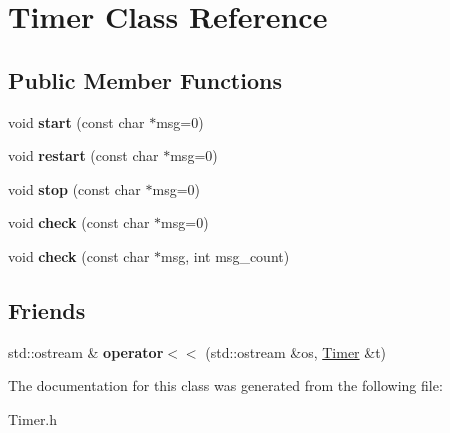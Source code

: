 \hypertarget{class_timer}{}\section{Timer Class Reference}
\label{class_timer}
\subsection*{Public Member Functions}
\begin{DoxyCompactItemize}
\item 
\hypertarget{class_timer_a1bf60b0af4a692b4305dc2f2c771a607}{}void {\bfseries start} (const char $\ast$msg=0)\label{class_timer_a1bf60b0af4a692b4305dc2f2c771a607}

\item 
\hypertarget{class_timer_a482a0e26d4830fbd0a6109d0f4674627}{}void {\bfseries restart} (const char $\ast$msg=0)\label{class_timer_a482a0e26d4830fbd0a6109d0f4674627}

\item 
\hypertarget{class_timer_a7978143362685aa773a82c20e79fac5c}{}void {\bfseries stop} (const char $\ast$msg=0)\label{class_timer_a7978143362685aa773a82c20e79fac5c}

\item 
\hypertarget{class_timer_ad6cf34a57edf68b6c002481b5c99eda0}{}void {\bfseries check} (const char $\ast$msg=0)\label{class_timer_ad6cf34a57edf68b6c002481b5c99eda0}

\item 
\hypertarget{class_timer_a8c693b2452f2b45ec6a8fb447ce8a9d7}{}void {\bfseries check} (const char $\ast$msg, int msg\+\_\+count)\label{class_timer_a8c693b2452f2b45ec6a8fb447ce8a9d7}

\end{DoxyCompactItemize}
\subsection*{Friends}
\begin{DoxyCompactItemize}
\item 
\hypertarget{class_timer_aeb6869755dddf82746eb3a53db89ca98}{}std\+::ostream \& {\bfseries operator$<$$<$} (std\+::ostream \&os, \hyperlink{class_timer}{Timer} \&t)\label{class_timer_aeb6869755dddf82746eb3a53db89ca98}

\end{DoxyCompactItemize}


The documentation for this class was generated from the following file\+:\begin{DoxyCompactItemize}
\item 
Timer.\+h\end{DoxyCompactItemize}
